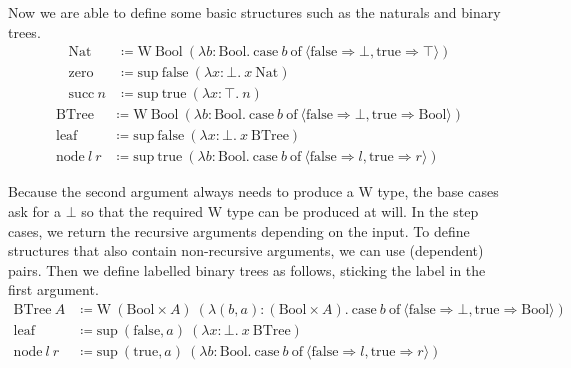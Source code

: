 \documentclass{report}
\newcommand{\Nat}{\const{Nat}}
\newcommand{\zero}{\const{zero}}
\renewcommand{\succ}{\const{succ}}
\newcommand{\BTree}{\const{BTree}}
\newcommand{\leaf}{\const{leaf}}
\newcommand{\node}{\const{node}}
\newcommand{\Bool}{\const{Bool}}
\newcommand{\true}{\const{true}}
\newcommand{\false}{\const{false}}
\newcommand{\W}{\const{W}}
\renewcommand{\sup}{\const{sup}}
\newcommand{\const}[1]{\text{#1}}
\newcommand{\case}{\const{case}}
\newcommand{\of}{\const{of}}
\begin{document}
\iffalse
We also explicitly state some reduction rules; as seen in \autoref{uniqueness}, having all $\eta$-reduction rules for all case and match expressions can be problematic, so we restrict ourselves to only the ones we need.
%
\begin{align*}
    \Gamma (t: \top) \vdash t &\rhd_{\eta_1} \star \\
    (\lambda t: \top. ~ f ~ \star) &\rhd_{\eta_2} f \\
    \case ~ P ~ t ~ \of ~ \langle \true \Rightarrow \true, \false \Rightarrow \false \rangle &\rhd_{\eta} t \\
    \case ~ P ~ t ~ \of ~ \langle \true \Rightarrow f ~ \true, \false \Rightarrow f ~ \false \rangle &\rhd_{\eta_1} f ~ t \\
    \case ~ P ~ t ~ \of ~ \langle \true \Rightarrow e, \false \Rightarrow e \rangle &\rhd_{\eta_2} e \\
    (\lambda (a, b): (x: A \times B). ~ e) ~ (l, r) &\rhd_\beta e[a \mapsto l, b \mapsto r]
\end{align*}
\fi

Now we are able to define some basic structures such as the naturals and binary trees.
%
\begin{align*}
    \Nat &\coloneqq \W ~ \Bool ~ (\lambda b: \Bool. ~ \case ~ b ~ \of ~ \langle \false \Rightarrow \bot, \true \Rightarrow \top \rangle) \\
    \zero &\coloneqq \sup ~ \false ~ (\lambda x: \bot. ~ x ~ \Nat) \\
    \succ ~ n &\coloneqq \sup ~ \true ~ (\lambda x: \top. ~ n)
\end{align*}
\begin{align*}
    \BTree &\coloneqq \W ~ \Bool ~ (\lambda b: \Bool. ~ \case ~ b ~ \of ~ \langle \false \Rightarrow \bot, \true \Rightarrow \Bool \rangle) \\
    \leaf &\coloneqq \sup ~ \false ~ (\lambda x: \bot. ~ x ~ \BTree) \\
    \node ~ l ~ r &\coloneqq \sup ~ \true ~ (\lambda b: \Bool. ~ \case ~ b ~ \of ~ \langle \false \Rightarrow l, \true \Rightarrow r \rangle)
\end{align*}

Because the second argument always needs to produce a W type, the base cases ask for a $\bot$ so that the required W type can be produced at will. In the step cases, we return the recursive arguments depending on the input. To define structures that also contain non-recursive arguments, we can use (dependent) pairs. Then we define labelled binary trees as follows, sticking the label in the first argument.
%
\begin{align*}
    \BTree ~ A &\coloneqq \W ~ (\Bool \times A) ~ (\lambda (b, a): (\Bool \times A). ~ \case ~ b ~ \of ~ \langle \false \Rightarrow \bot, \true \Rightarrow \Bool \rangle) \\
    \leaf &\coloneqq \sup ~ (\false, a) ~ (\lambda x: \bot. ~ x ~ \BTree) \\
    \node ~ l ~ r &\coloneqq \sup ~ (\true, a) ~ (\lambda b: \Bool. ~ \case ~ b ~ \of ~ \langle \false \Rightarrow l, \true \Rightarrow r \rangle)
\end{align*}
\end{document}

